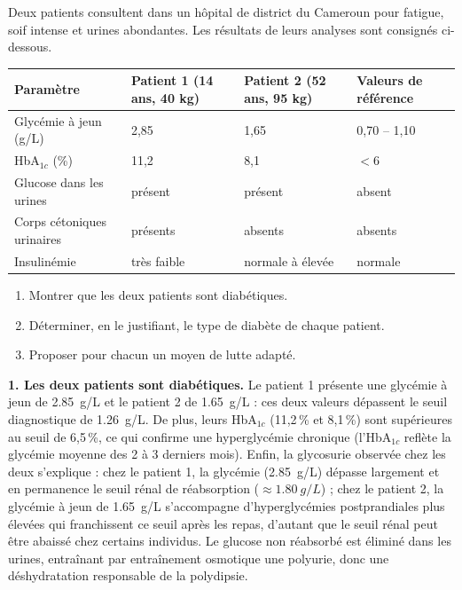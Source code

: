 \documentclass[11pt]{article}
\begin{document}
\begin{exoresolu}
Deux patients consultent dans un hôpital de district du Cameroun pour fatigue, soif intense et urines abondantes. Les résultats de leurs analyses sont consignés ci-dessous.

\begin{center}
\begin{tabularx}{\linewidth}{|l|X|X|X|}\hline
\rowcolor{popblueL} Paramètre & Patient 1 (14 ans, 40 kg) & Patient 2 (52 ans, 95 kg) & Valeurs de référence \\ \hline
Glycémie à jeun (g/L) & 2,85 & 1,65 & 0,70 -- 1,10 \\ \hline
HbA$_{1c}$ (\%) & 11,2 & 8,1 & $< 6$ \\ \hline
Glucose dans les urines & présent & présent & absent \\ \hline
Corps cétoniques urinaires & présents & absents & absents \\ \hline
Insulinémie & très faible & normale à élevée & normale \\ \hline
\end{tabularx}
\end{center}

\begin{enumerate}
\item Montrer que les deux patients sont diabétiques.
\item Déterminer, en le justifiant, le type de diabète de chaque patient.
\item Proposer pour chacun un moyen de lutte adapté.
\end{enumerate}

\tcblower

\textbf{1. Les deux patients sont diabétiques.} Le patient 1 présente une glycémie à jeun de \SI{2,85}{g/L} et le patient 2 de \SI{1,65}{g/L} : ces deux valeurs dépassent le seuil diagnostique de \SI{1,26}{g/L}. De plus, leurs HbA$_{1c}$ (11,2\,\% et 8,1\,\%) sont supérieures au seuil de 6,5\,\%, ce qui confirme une hyperglycémie chronique (l'HbA$_{1c}$ reflète la glycémie moyenne des 2 à 3 derniers mois). Enfin, la glycosurie observée chez les deux s'explique : chez le patient 1, la glycémie (\SI{2,85}{g/L}) dépasse largement et en permanence le seuil rénal de réabsorption ($\approx \SI{1,80}{g/L}$) ; chez le patient 2, la glycémie à jeun de \SI{1,65}{g/L} s'accompagne d'hyperglycémies postprandiales plus élevées qui franchissent ce seuil après les repas, d'autant que le seuil rénal peut être abaissé chez certains individus. Le glucose non réabsorbé est éliminé dans les urines, entraînant par entraînement osmotique une polyurie, donc une déshydratation responsable de la polydipsie.


\end{exoresolu}
\end{document}
